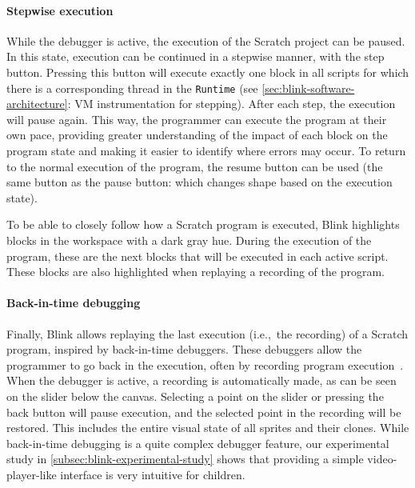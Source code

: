 \documentclass[../main]{subfiles}
\begin{document}
\paragraph{Stepwise execution}
While the debugger is active, the execution of the Scratch project can be paused.
In this state, execution can be continued in a stepwise manner, with the step button.
Pressing this button will execute exactly one block in all scripts for which there is a corresponding thread in the \texttt{Runtime} (see \vref{sec:blink-software-architecture}: VM instrumentation for stepping).
After each step, the execution will pause again.
This way, the programmer can execute the program at their own pace, providing greater understanding of the impact of each block on the program state and making it easier to identify where errors may occur.
To return to the normal execution of the program, the resume button can be used (the same button as the pause button: which changes shape based on the execution state).

To be able to closely follow how a Scratch program is executed, Blink highlights blocks in the workspace with a dark gray hue.
During the execution of the program, these are the next blocks that will be executed in each active script.
These blocks are also highlighted when replaying a recording of the program.

\paragraph{Back-in-time debugging}
Finally, Blink allows replaying the last execution (i.e.,\ the recording) of a Scratch program, inspired by back-in-time debuggers.
These debuggers allow the programmer to go back in the execution, often by recording program execution~\autocite{barrTardisAffordableTimetravel2014a,barrTimetravelDebuggingJavaScript2016a,czaplickiAsynchronousFunctionalReactive2013a,balzerEXDAMSExtendableDebugging1969,ungarDebuggingExperienceImmediacy1997,chenReversibleDebuggingUsing2001,crescenziReversibleExecutionVisualization2000}.
When the debugger is active, a recording is automatically made, as can be seen on the slider below the canvas.
Selecting a point on the slider or pressing the back button will pause execution, and the selected point in the recording will be restored.
This includes the entire visual state of all sprites and their clones.
While back-in-time debugging is a quite complex debugger feature, our experimental study in \vref{subsec:blink-experimental-study} shows that providing a simple video-player-like interface is very intuitive for children.
\end{document}
